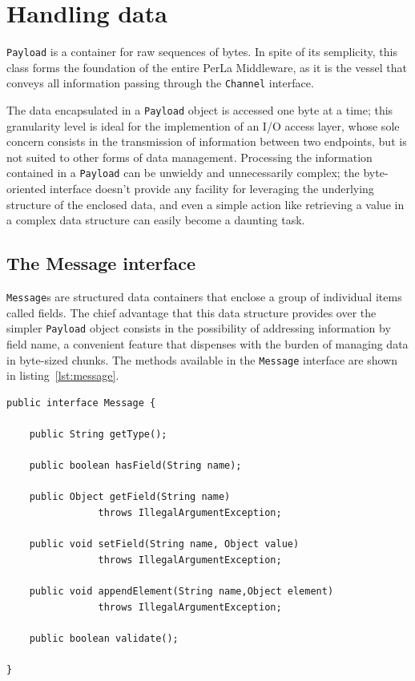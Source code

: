 \section{Handling data}
\label{sec:components.mapper}

\texttt{Payload} is a container for raw sequences of bytes. In spite of its
semplicity, this class forms the foundation of the entire PerLa Middleware, as
it is the vessel that conveys all information passing through the
\texttt{Channel} interface.

The data encapsulated in a \texttt{Payload} object is accessed one byte at a
time; this granularity level is ideal for the implemention of an I/O access
layer, whose sole concern consists in the transmission of information between
two endpoints, but is not suited to other forms of data management. Processing
the information contained in a \texttt{Payload} can be unwieldy and
unnecessarily complex; the byte-oriented interface doesn't provide any facility
for leveraging the underlying structure of the enclosed data, and even a simple
action like retrieving a value in a complex data structure can easily become a
daunting task.


\subsection{The Message interface}

\texttt{Message}s are structured data containers that enclose a group of
individual items called fields. The chief advantage that this data structure
provides over the simpler \texttt{Payload} object consists in the possibility
of addressing information by field name, a convenient feature that dispenses
with the burden of managing data in byte-sized chunks. The methods available in
the \texttt{Message} interface are shown in listing~\ref{lst:message}.

\lstset{language=Java}
\begin{lstlisting}[float,floatplacement=!hbt,caption=The Message
interface,label={lst:message}]
public interface Message {

    public String getType();

    public boolean hasField(String name);

    public Object getField(String name)
                throws IllegalArgumentException;

    public void setField(String name, Object value)
                throws IllegalArgumentException;

    public void appendElement(String name,Object element)
                throws IllegalArgumentException;

    public boolean validate();

}
\end{lstlisting}

